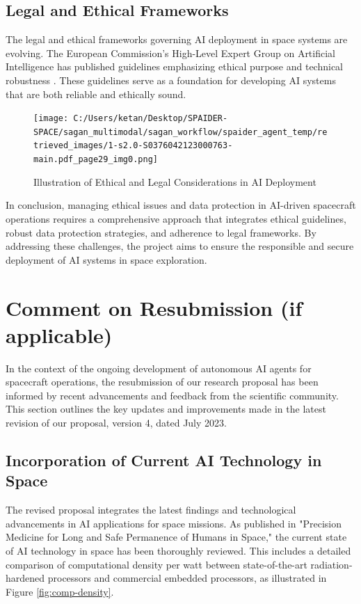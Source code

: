 \documentclass[a4paper, 11pt]{article}
\begin{document}
\subsection{Legal and Ethical Frameworks}

The legal and ethical frameworks governing AI deployment in space systems are evolving. The European Commission's High-Level Expert Group on Artificial Intelligence has published guidelines emphasizing ethical purpose and technical robustness \cite{ec_guidelines_2018}. These guidelines serve as a foundation for developing AI systems that are both reliable and ethically sound.

\begin{figure}[htbp]
    \centering
    \texttt{[image: C:/Users/ketan/Desktop/SPAIDER-SPACE/sagan\_multimodal/sagan\_workflow/spaider\_agent\_temp/retrieved\_images/1-s2.0-S0376042123000763-main.pdf\_page29\_img0.png]}
    \caption{Illustration of Ethical and Legal Considerations in AI Deployment}
    \label{fig:ethical-legal-considerations}
\end{figure}

In conclusion, managing ethical issues and data protection in AI-driven spacecraft operations requires a comprehensive approach that integrates ethical guidelines, robust data protection strategies, and adherence to legal frameworks. By addressing these challenges, the project aims to ensure the responsible and secure deployment of AI systems in space exploration.
\section{Comment on Resubmission (if applicable)}

In the context of the ongoing development of autonomous AI agents for spacecraft operations, the resubmission of our research proposal has been informed by recent advancements and feedback from the scientific community. This section outlines the key updates and improvements made in the latest revision of our proposal, version 4, dated July 2023.

\subsection{Incorporation of Current AI Technology in Space}

The revised proposal integrates the latest findings and technological advancements in AI applications for space missions. As published in "Precision Medicine for Long and Safe Permanence of Humans in Space," the current state of AI technology in space has been thoroughly reviewed. This includes a detailed comparison of computational density per watt between state-of-the-art radiation-hardened processors and commercial embedded processors, as illustrated in Figure \ref{fig:comp-density}.
\end{document}
